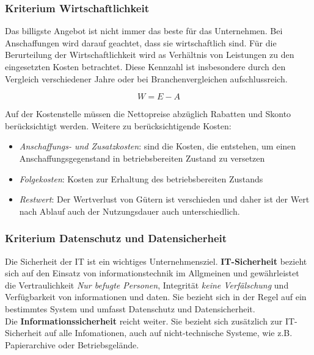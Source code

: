 \documentclass[a4paper, 12pt]{report}
\begin{document}
\subsubsection{Kriterium Wirtschaftlichkeit}

Das billigste Angebot ist nicht immer das beste für das Unternehmen. Bei
Anschaffungen wird darauf geachtet, dass sie wirtschaftlich sind. Für die
Berurteilung der Wirtschaftlichkeit wird as Verhältnis von Leistungen zu den
eingesetzten Kosten betrachtet. Diese Kennzahl ist insbesondere durch den
Vergleich verschiedener Jahre oder bei Branchenvergleichen aufschlussreich.

\begin{center}
    \begin{equation}
	W = E - A
    \end{equation}
\end{center}

Auf der Kostenstelle müssen die Nettopreise abzüglich Rabatten und Skonto
berücksichtigt werden. Weitere zu berücksichtigende Kosten:

\begin{itemize}
    \item \emph{Anschaffungs- und Zusatzkosten}: sind die Kosten, die entstehen,
	um einen Anschaffungsgegenstand in betriebsbereiten Zustand zu versetzen
    \item \emph{Folgekosten}: Kosten zur Erhaltung des betriebsbereiten Zustands
    \item \emph{Restwert}: Der Wertverlust von Gütern ist verschieden und daher
	ist der Wert nach Ablauf auch der Nutzungsdauer auch unterschiedlich.
\end{itemize}

\subsubsection{Kriterium Datenschutz und Datensicherheit}

Die Sicherheit der IT ist ein wichtiges Unternehmensziel. \textbf{IT-Sicherheit}
bezieht sich auf den Einsatz von informationstechnik im Allgmeinen und
gewährleistet die Vertraulichkeit \emph{Nur befugte Personen}, Integrität
\emph{keine Verfälschung} und Verfügbarkeit von informationen und daten. Sie
bezieht sich in der Regel auf ein bestimmtes System und umfasst Datenschutz und
Datensicherheit. \\

Die \textbf{Informationssicherheit} reicht weiter. Sie bezieht sich zusätzlich
zur IT-Sicherheit auf alle Infomationen, auch auf nicht-technische Systeme,
wie z.B. Papierarchive oder Betriebsgelände. \\
\end{document}
